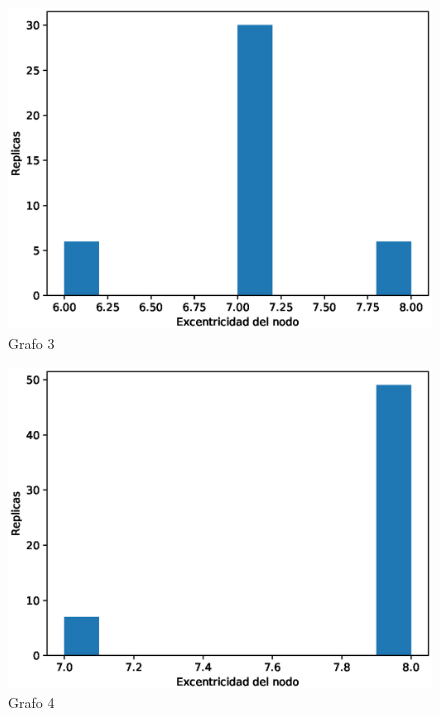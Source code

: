 \documentclass{article}
\begin{document}
\begin{figure}[H]
    \includegraphics[scale=0.6]{hist-centralidad-3}
    \caption{Grafo 3}
    \label{fig:matriz}
\end{figure}
\begin{figure}[H]
    \includegraphics[scale=0.6]{hist-centralidad-4}
    \caption{Grafo 4}
    \label{fig:matriz}
\end{figure}
\end{document}
